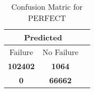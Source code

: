 \begin{table}[] 
\caption{Confusion Matric for PERFECT} 
\label{Table: Prediction Accuracy-DMDPERFECTOnlySunEKF-combinationReflectionEKF-top2-Reflection} 
\centering 
\begin{tabular} 
 {@{}ccc@{}} 
\toprule 
\multicolumn{2}{c}{\textbf{Predicted}}
 \\ \midrule 
\multicolumn{1}{|c|}{Failure} & 
\multicolumn{1}{c|}{No Failure}
 \\ \midrule 
\multicolumn{1}{|c|}{\color{green}\textbf{102402}} & 
\multicolumn{1}{c|}{\color{red}\textbf{1064}}
 \\ \midrule 
\multicolumn{1}{|c|}{\color{red}\textbf{0}} & 
\multicolumn{1}{c|}{\color{green}\textbf{66662}}
 \\ \bottomrule 
\end{tabular} 
\end{table} 
